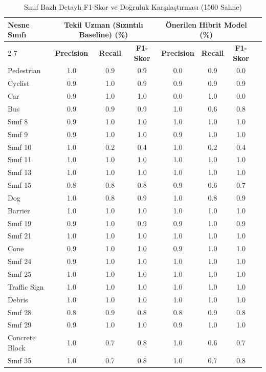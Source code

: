 \begin{table}[htbp]
\caption{Sınıf Bazlı Detaylı F1-Skor ve Doğruluk Karşılaştırması (1500 Sahne)}
\label{tab:class_breakdown_1500}
\centering
\begin{tabular}{lccccccc}
\hline
\textbf{Nesne Sınıfı} & \multicolumn{3}{c}{\textbf{Tekil Uzman (Sızıntılı Baseline) (\%)}} & \multicolumn{3}{c}{\textbf{Önerilen Hibrit Model (\%)}} \\ \cline{2-7} 
 & \textbf{Precision} & \textbf{Recall} & \textbf{F1-Skor} & \textbf{Precision} & \textbf{Recall} & \textbf{F1-Skor} \\ \hline
Pedestrian & 1.0 & 0.9 & 0.9 & 0.0 & 0.9 & 0.0 \\
Cyclist & 0.9 & 1.0 & 0.9 & 0.9 & 0.9 & 0.9 \\
Car & 0.9 & 1.0 & 1.0 & 0.0 & 1.0 & 0.0 \\
Bus & 0.9 & 0.9 & 0.9 & 1.0 & 0.6 & 0.8 \\
Sınıf 8 & 0.9 & 1.0 & 1.0 & 1.0 & 1.0 & 1.0 \\
Sınıf 9 & 0.9 & 1.0 & 1.0 & 0.9 & 1.0 & 1.0 \\
Sınıf 10 & 1.0 & 0.2 & 0.4 & 1.0 & 0.2 & 0.4 \\
Sınıf 11 & 1.0 & 1.0 & 1.0 & 1.0 & 1.0 & 1.0 \\
Sınıf 13 & 1.0 & 1.0 & 1.0 & 1.0 & 1.0 & 1.0 \\
Sınıf 15 & 0.8 & 0.8 & 0.8 & 0.9 & 0.6 & 0.7 \\
Dog & 1.0 & 0.8 & 0.9 & 1.0 & 0.8 & 0.9 \\
Barrier & 1.0 & 1.0 & 1.0 & 1.0 & 1.0 & 1.0 \\
Sınıf 19 & 0.9 & 1.0 & 0.9 & 0.9 & 1.0 & 0.9 \\
Sınıf 21 & 1.0 & 1.0 & 1.0 & 1.0 & 1.0 & 1.0 \\
Cone & 0.9 & 1.0 & 1.0 & 0.9 & 1.0 & 1.0 \\
Sınıf 24 & 0.9 & 1.0 & 1.0 & 1.0 & 1.0 & 1.0 \\
Sınıf 25 & 1.0 & 1.0 & 1.0 & 1.0 & 1.0 & 1.0 \\
Traffic Sign & 1.0 & 1.0 & 1.0 & 1.0 & 1.0 & 1.0 \\
Debris & 1.0 & 1.0 & 1.0 & 1.0 & 1.0 & 1.0 \\
Sınıf 28 & 0.8 & 0.9 & 0.8 & 0.8 & 0.9 & 0.8 \\
Sınıf 29 & 0.9 & 1.0 & 1.0 & 0.9 & 1.0 & 1.0 \\
Concrete Block & 1.0 & 0.7 & 0.8 & 1.0 & 0.6 & 0.7 \\
Sınıf 35 & 1.0 & 0.7 & 0.8 & 1.0 & 0.7 & 0.8 \\
\hline
\end{tabular}
\end{table}

